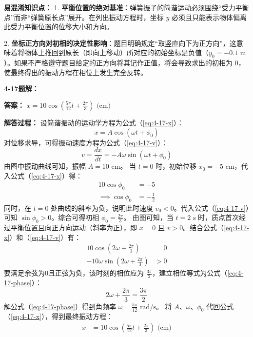 \textbf{易混淆知识点： }
1. \textbf{平衡位置的绝对基准}：弹簧振子的简谐运动必须围绕“受力平衡点”而非“弹簧原长点”展开。在列出振动方程时，坐标 $y$ 必须且只能表示物体偏离此受力平衡位置的位移大小和方向。

2. \textbf{坐标正方向对初相的决定性影响}：题目明确规定“取竖直向下为正方向”，这意味着将物体上推回到原长（即向上移动）所对应的初始坐标是负值（$y_0 = -0.1\text{ m}$）。如果不严格遵守题目给定的正方向将其记作正值，将会导致求出的初相为 $0$，使最终得出的振动方程在相位上发生完全反转。

\vspace{2em}

\textbf{4-17题解： }
\setcounter{equation}{0}
\renewcommand{\theHequation}{4-17.\arabic{equation}}

\textbf{答案： }
$x = 10 \cos\left(\frac{5\pi}{12} t + \frac{2\pi}{3}\right) \text{ (cm)}$

\textbf{解答过程： }
设简谐振动的运动学方程为公式（\ref{eq:4-17-x}）：
\begin{equation}\label{eq:4-17-x}
	x = A \cos(\omega t + \phi_0)
\end{equation}
对位移求导，可得振动速度方程为公式（\ref{eq:4-17-v}）：
\begin{equation}\label{eq:4-17-v}
	v = \frac{dx}{dt} = -A\omega \sin(\omega t + \phi_0)
\end{equation}
由图中振动曲线可知，振幅 $A = 10 \text{ cm}$。
当 $t = 0$ 时，初始位移 $x_0 = -5 \text{ cm}$，代入公式（\ref{eq:4-17-x}）得：
\begin{align*}
	10 \cos\phi_0 &= -5 \\
	\implies \cos\phi_0 &= -\frac{1}{2}
\end{align*}
同时，在 $t=0$ 处曲线的斜率为负，说明此时速度 $v_0 < 0$。代入公式（\ref{eq:4-17-v}）可知 $\sin\phi_0 > 0$。综合可得初相 $\phi_0 = \frac{2\pi}{3}$。
由图可知，当 $t = 2 \text{ s}$ 时，质点首次经过平衡位置且向正方向运动（斜率为正），即 $x = 0$ 且 $v > 0$。结合公式（\ref{eq:4-17-x}）和（\ref{eq:4-17-v}）有：
\begin{align*}
	10 \cos\left(2\omega + \frac{2\pi}{3}\right) &= 0 \\
	-10\omega \sin\left(2\omega + \frac{2\pi}{3}\right) &> 0
\end{align*}
要满足余弦为0且正弦为负，该时刻的相位应为 $\frac{3\pi}{2}$，建立相位等式为公式（\ref{eq:4-17-phase}）：
\begin{equation}\label{eq:4-17-phase}
	2\omega + \frac{2\pi}{3} = \frac{3\pi}{2}
\end{equation}
解公式（\ref{eq:4-17-phase}）得到角频率 $\omega = \frac{5\pi}{12} \text{ rad/s}$。
将 $A$、$\omega$、$\phi_0$ 代回公式（\ref{eq:4-17-x}），得到最终振动方程：
\begin{align*}
	x &= 10 \cos\left(\frac{5\pi}{12} t + \frac{2\pi}{3}\right) \text{ (cm)}
\end{align*}

